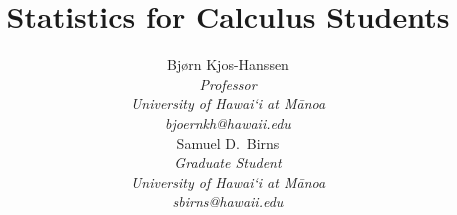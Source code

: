 
\title{\huge Statistics for Calculus Students\vspace{1.5mm} %
}
\author{Bj\o rn Kjos-Hanssen \\
\small\emph{Professor} \\
\small\emph{University of Hawai\textquoteleft i at M\=anoa} \\
\vspace{6mm}%
\small\emph{bjoernkh@hawaii.edu} \\
Samuel D.~Birns \\
\small\emph{Graduate Student} \\
\small\emph{University of Hawai\textquoteleft i at M\=anoa} \\
\vspace{6mm}%
\small\emph{sbirns@hawaii.edu}}
